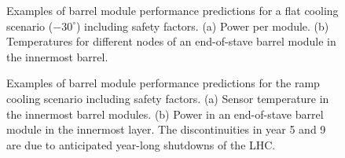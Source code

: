 \begin{figure}[ht]
\centering
{}\quad\quad
{}
\caption{Examples of barrel module performance predictions for a flat cooling scenario ($-30^\circ$) including safety factors. (a) Power per module. (b) Temperatures for different nodes of an end-of-stave barrel module in the innermost barrel.}
\label{fig:moduleflatperformance}
\end{figure}

\begin{figure}[ht]
\centering
{}\quad\quad
{}
\caption{Examples of barrel module performance predictions for the ramp cooling scenario including safety factors. (a) Sensor temperature in the innermost barrel modules. (b) Power in an end-of-stave barrel module in the innermost layer. The discontinuities in year 5 and 9 are due to anticipated year-long shutdowns of the LHC.}
\label{fig:modulerampperformance}
\end{figure}

